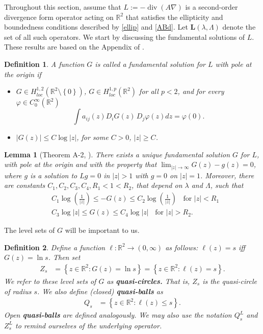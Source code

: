 \documentclass[12pt,reqno]{amsart}
\theoremstyle{plain}
\newtheorem{lem}{Lemma}
\newtheorem{defn}{Definition}
\theoremstyle{definition}
\newcommand{\disp}{\displaystyle}
\DeclareMathOperator{\di}{div}
\newcommand{\vp}{\varphi}
\newcommand{\la}{\lambda}
\newcommand{\La}{\Lambda}
\newcommand{\iny}{\infty}
\newcommand{\gr}{\nabla}
\newcommand{\abs}[1]{\left\vert#1\right\vert}
\newcommand{\set}[1]{\left\{#1\right\}}
\newcommand{\pr}[1]{\left( #1 \right) }
\newcommand{\R}{\ensuremath{\mathbb{R}}}
\begin{document}
Throughout this section, assume that $L := - \di\pr{A \gr}$ is a second-order divergence form operator acting on $\R^2$ that satisfies the ellipticity and boundedness conditions described by \eqref{ellip} and \eqref{ABd}.
Let $\mathbf{L}\pr{\la, \La}$ denote the set of all such operators.
We start by discussing the fundamental solutions of $L$.
These results are based on the Appendix of \cite{KN85}.

\begin{defn}
A function $G$ is called a fundamental solution for $L$ with pole at the origin if
\begin{itemize}
\item $G \in H^{1,2}_{loc}\pr{\R^2 \setminus \set{0}}$, $G \in H^{1,p}_{loc}\pr{\R^2}$ for all $p < 2$, and for every $\vp \in C^\iny_0\pr{\R^2}$
$$\int a_{ij}\pr{z} D_i G\pr{z} \,  D_j \vp\pr{z} dz = \vp\pr{0}.$$
\item $\abs{G\pr{z} } \le C \log \abs{z}$, for some $C > 0$, {$|z|\ge C$}.
\end{itemize}
\end{defn}

\begin{lem}[Theorem A-2, \cite{KN85}]
There exists a unique fundamental solution $G$ for $L$, with pole at the origin and with the property that $\disp \lim_{\abs{z} \to \iny} G\pr{z} - g\pr{z} = 0$, where $g$ is a solution to $L g = 0$ in $\abs{z} > 1$ with $g = 0$ on $\abs{z} = 1$.
Moreover, there are constants $C_1, C_2, C_3, C_4, R_1 < 1 < R_2$, that depend on $\la$ and $\La$, such that
\begin{align*}
&C_1 \log\pr{\frac{1}{\abs{z}}} \le - G\pr{z} \le C_2 \log \pr{\frac{1}{\abs{z}}} \;\; \text{ for } \abs{z} < R_1 \\
& C_3 \log\abs{z} \le G\pr{z} \le C_4 \log \abs{z} \;\; \text{ for } \abs{z} > R_2.
\end{align*}
\label{fundSolBds}
\end{lem}

The level sets of $G$ will be important to us.

\begin{defn}
Define a function $\ell: \R^2 \to \pr{0, \iny}$ as follows: $\ell\pr{z} = s$ iff $G\pr{z} = \ln s$.
Then set 
\begin{align*}
Z_s &= \set{ z \in \R^2 : G\pr{z} = \ln s} 
= \set{ z \in \R^2 : \ell\pr{z} = s} .
\end{align*}
We refer to these level sets of $G$ as {\bf quasi-circles.}
That is, $Z_s$ is the quasi-circle of radius $s$.
We also define (closed) {\bf quasi-balls} as
\begin{align*}
Q_s &= \set{ z \in \R^2 : \ell\pr{z} \le s} .
\end{align*}
Open {\bf quasi-balls} are defined analogously.
We may also use the notation $Q_s^L$ and $Z_s^L$ to remind ourselves of the underlying operator.
\end{defn}
\end{document}
